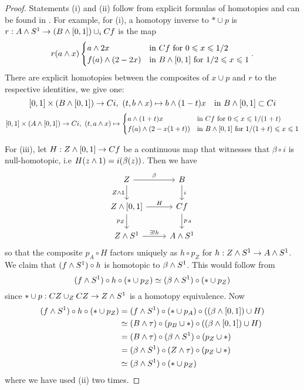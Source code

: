 \begin{proof}
Statements (i) and (ii) follow from explicit formulas of homotopies and can be found in \cite{schwede}. For example, for (i), a homotopy inverse to $*\cup p$ is $r:A\wedge S^1\to(B\wedge[0,1])\cup_i Cf$ is the map
\[
r(a\wedge x)\begin{cases}
a\wedge2x & \text{in }Cf\text{ for }0\leqslant x\leqslant 1/2\\
f(a)\wedge(2-2x) & \text{in }B\wedge[0,1]\text{ for }1/2\leqslant x\leqslant1
\end{cases}.
\]
There are explicit homotopies between the composites of $x\cup p$ and $r$ to the respective identities, we give one:
\[[0,1]\times(B\wedge[0,1])\to Ci,\ (t,b\wedge x)\mapsto b\wedge(1-t)x\quad\text{in }B\wedge[0,1]\subset Ci\]
{\small\[[0,1]\times(A\smsh[0,1])\to Ci,\ (t,a\smsh x)\mapsto{\begin{cases}
a\smsh(1+t)x & \text{in }Cf\text{ for }0\leq x\leq 1/(1+t)\\
f(a)\smsh(2-x(1+t)) & \text{in }B\smsh[0,1]\text{ for }1/(1+t)\leq x\leq1
\end{cases}}\]}

For (iii), let $H:Z\wedge[0,1]\to Cf$ be a continuous map that witnesses that $\beta\circ i$ is null-homotopic, i.e $H(z\wedge1)=i(\beta(z))$. Then we have
\[
\begin{tikzcd}
Z \ar[d,"Z\smsh1"'] \ar[r,"\beta"] & B \ar[d,"i"]\\
Z\smsh[0,1] \ar[d,"p_Z"'] \ar[r,"H"] & Cf \ar[d,"p_A"]\\
Z\smsh S^1 \ar[r,"\exists! h"] & A\smsh S^1
\end{tikzcd}
\]
so that the composite $p_A\circ H$ factors uniquely as $h\circ p_Z$ for $h:Z\wedge S^1\to A\wedge S^1$. We claim that $(f\wedge S^1)\circ h$ is homotopic to $\beta\wedge S^1$. This  would follow from
\[(f\wedge S^1)\circ h\circ(*\cup p_Z)\simeq(\beta\wedge S^1)\circ(*\cup p_Z)\]
since $*\cup p:CZ\cup_Z CZ\to Z\wedge S^1$ is a homotopy equivalence. Now
\begin{align*}
    (f\wedge S^1)\circ h\circ(*\cup p_Z)&=(f\wedge S^1)\circ(*\cup p_A)\circ((\beta\wedge[0,1])\cup H)\\
    &\simeq(B\wedge\tau)\circ(p_B\cup*)\circ((\beta\wedge[0,1])\cup H)\\
    &=(B\wedge\tau)\circ(\beta\wedge S^1)\circ(p_Z\cup*)\\
    &=(\beta\wedge S^1)\circ(Z\wedge\tau)\circ(p_Z\cup*)\\
    &\simeq(\beta\wedge S^1)\circ(*\cup p_Z)    
\end{align*}
where we have used (ii) two times.
\end{proof}

